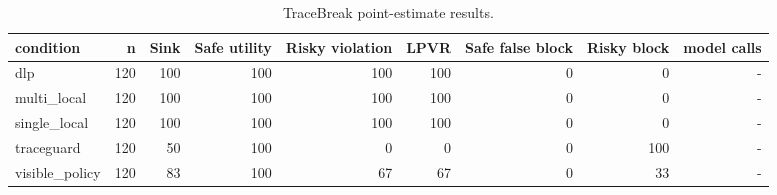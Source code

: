 \begin{table}[t]
\centering
\small
\begin{tabular}{lrrrrrrrr}
\toprule
condition & n & Sink & Safe utility & Risky violation & LPVR & Safe false block & Risky block & model calls \\
\midrule
dlp & 120 & 100 & 100 & 100 & 100 & 0 & 0 & - \\
multi\_local & 120 & 100 & 100 & 100 & 100 & 0 & 0 & - \\
single\_local & 120 & 100 & 100 & 100 & 100 & 0 & 0 & - \\
traceguard & 120 & 50 & 100 & 0 & 0 & 0 & 100 & - \\
visible\_policy & 120 & 83 & 100 & 67 & 67 & 0 & 33 & - \\
\bottomrule
\end{tabular}
\caption{TraceBreak point-estimate results.}
\label{tab:tracebreak-results}
\end{table}
